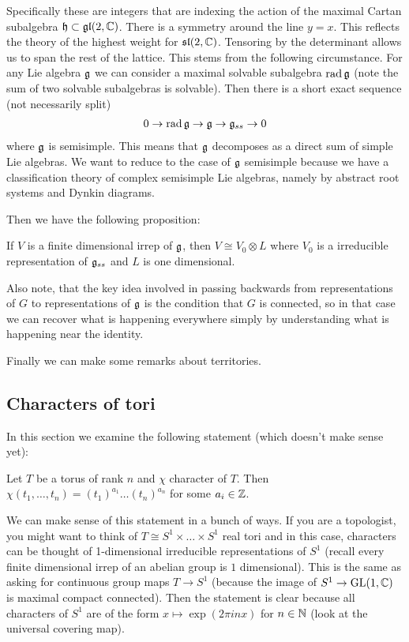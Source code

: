 \documentclass[12pt]{article}
\begin{document}
Specifically these are integers that are indexing the action of the maximal Cartan subalgebra $\mathfrak{h} \subset \operatorname{\mathfrak{gl}}(2,\mathbb{C})$. There is a symmetry around the line $y=x$. This reflects the theory 
of the highest weight for $\mathfrak{sl}(2,\mathbb{C})$. Tensoring by the determinant allows us to span the rest of the lattice. This stems from the following circumstance. For any Lie algebra $\mathfrak{g}$ we can 
consider a maximal solvable subalgebra $\operatorname{rad} \mathfrak{g}$ (note the sum of two solvable subalgebras is solvable). Then there is a short exact sequence (not necessarily split) \begin{align*}
    0\to \operatorname{rad}\mathfrak{g}\to \mathfrak{g} \to \mathfrak{g}_{ss} \to 0
\end{align*} where $\mathfrak{g}$ is semisimple. This means that $\mathfrak{g}$ decomposes as a direct sum of simple Lie algebras. We want to reduce to the case of $\mathfrak{g}$ semisimple because 
we have a classification theory of complex semisimple Lie algebras, namely by abstract root systems and Dynkin diagrams.

Then we have the following proposition:
\begin{proposition}
    If $V$ is a finite dimensional irrep of $\mathfrak{g}$, then $V \cong V_0 \otimes L$ where $V_0$ is a irreducible representation of $\mathfrak{g}_{ss}$ and $L$ is one dimensional.
\end{proposition}
Also note, that the key idea involved in passing backwards from representations of $G$ to representations of $\mathfrak{g}$ is the condition that $G$ is connected, so in that case we can recover what is happening 
everywhere simply by understanding what is happening near the identity.

Finally we can make some remarks about territories. 

\subsection{Characters of tori}
In this section we examine the following statement (which doesn't make sense yet):
\begin{theorem}
    Let $T$ be a torus of rank $n$ and $\chi$ character of $T$. 
    Then $\chi(t_1,\dots,t_n) = (t_1)^{a_1}\dots (t_n)^{a_n}$ for some $a_i\in \mathbb{Z}$.
\end{theorem}
We can make sense of this statement in a bunch of ways. If you are a topologist,
you might want to think of $T \cong S^1 \times \dots \times S^1$ real tori and in this case, 
characters can be thought of 1-dimensional irreducible representations of $S^1$ (recall every
finite dimensional irrep of an abelian group is $1$ dimensional). This is the same 
as asking for continuous group maps $T\to S^1$ (because the image of $S^1\to \operatorname{GL}(1,\mathbb{C})$ is maximal compact connected). Then the statement 
is clear because all characters of $S^1$ are of the form $x\mapsto \exp(2\pi in x)$ for $n\in \mathbb{N}$ (look 
at the universal covering map).
\end{document}

